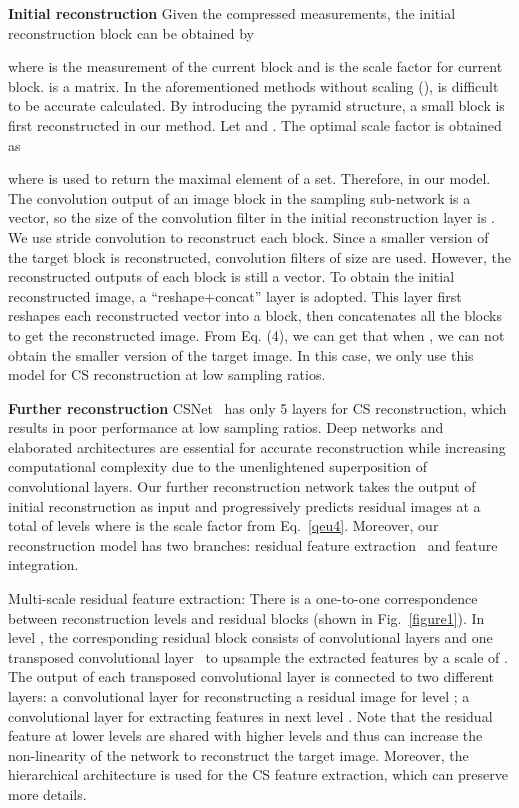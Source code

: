\documentclass{article}
\begin{document}
\textbf{Initial reconstruction}
Given the compressed measurements, the initial reconstruction block  can be obtained by

where  is the measurement of the current  block and  is the scale factor for current block.  is a  matrix. In the  aforementioned
methods without scaling (), is difficult to be accurate calculated. By introducing the pyramid structure, a small block is first reconstructed in our method. Let  and . The optimal scale factor  is obtained as

where  is used to return the maximal element of a set. Therefore,   in our model. The convolution output of an image block in the sampling sub-network is a  vector, so the size of the convolution filter in the initial reconstruction layer is . We use  stride convolution to reconstruct each block. Since a smaller version of the target block is reconstructed,  convolution filters of size  are used. However, the reconstructed outputs of each block is still a vector. To obtain the initial reconstructed image, a ``reshape+concat'' layer is adopted. This layer first reshapes each  reconstructed vector into a  block, then concatenates all the blocks to get the reconstructed image. From Eq. (4), we can get that when , we can not obtain the smaller version of the target image. In this case, we only use this model for CS reconstruction at low sampling ratios.


\textbf{Further reconstruction}
CSNet~\cite{shi2017deep} has only 5 layers for CS reconstruction, which results in poor performance at low sampling ratios. Deep networks and elaborated architectures are essential for accurate reconstruction while increasing computational complexity due to the unenlightened superposition of convolutional layers. Our further reconstruction network takes the output of initial reconstruction as input and progressively predicts residual images at a total of  levels where  is the scale factor from Eq.~\ref{qeu4}. Moreover, our reconstruction model has two branches: residual feature extraction~\cite{he2016deep} and feature integration.

 Multi-scale residual feature extraction: There is a one-to-one correspondence between reconstruction levels and residual blocks (shown in Fig.~\ref{figure1}). In level , the corresponding residual block consists of  convolutional layers and one transposed convolutional layer~\cite{dumoulin2016guide} to upsample the extracted features by a scale of . The output of each transposed convolutional layer is connected to two different layers:  a convolutional layer for reconstructing a residual image for level ;  a convolutional layer for extracting features in next level . Note that the residual feature at lower levels are shared with higher levels and thus can increase the non-linearity of the network to reconstruct the target image. Moreover, the hierarchical architecture is used for the CS feature extraction, which can preserve more details.
\end{document}
